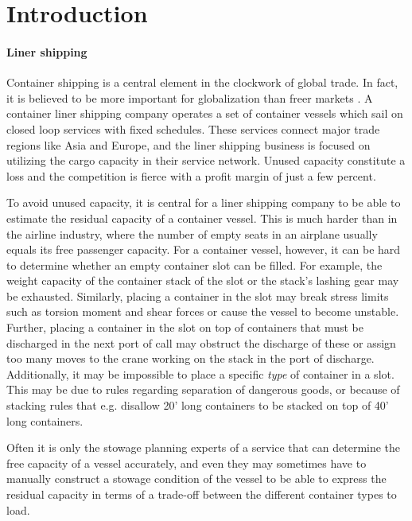 


\section{Introduction}
\paragraph{Liner shipping}
Container shipping is a central element in the clockwork of global trade. In fact, it is believed to be more important for globalization than freer markets \cite{EC13}. A container liner shipping company operates a set of container vessels which sail on closed loop services with fixed schedules. These services connect major trade regions like Asia and Europe, and the liner shipping business is focused on utilizing the cargo capacity in their service network. Unused capacity constitute a loss and the competition is fierce with a profit margin of just a few percent.  

To avoid unused capacity, it is central for a liner shipping company to be able to estimate the residual capacity of a container vessel. This is much harder than in the airline industry, where the number of empty seats in an airplane usually equals its free passenger capacity. For a container vessel, however, it can be hard to determine whether an empty container slot can be filled.  
For example, the weight capacity of the container stack of the slot or the stack's lashing gear may be exhausted. 
Similarly, placing a container in the slot may break stress limits such as torsion moment and shear forces or cause the vessel to become unstable.
Further, placing a container in the slot on top of containers that must be discharged in the next port of call may obstruct the discharge of these or assign too many moves to the crane working on the stack in the port of discharge. 
%
Additionally, it may be impossible to place a specific \emph{type} of container in a slot. This may be due to rules regarding separation of dangerous goods, or because of stacking rules that e.g. disallow 20' long containers to be stacked on top of 40' long containers. 

Often it is only the stowage planning experts of a service that can determine the free capacity of a vessel accurately, and even they may sometimes have to manually construct a stowage condition of the vessel to be able to express the residual capacity in terms of a trade-off between the different container types to load.


